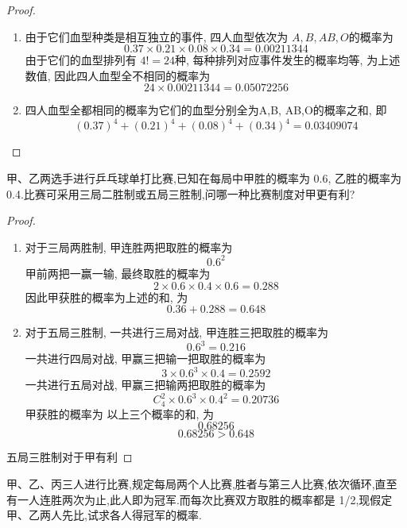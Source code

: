 \documentclass[../main.tex]{subfiles}
\begin{document}
\begin{proof}
    \begin{enumerate}
        \item 由于它们血型种类是相互独立的事件, 四人血型依次为 \(  A,B, AB, O  \)的概率为 \[
        0.37\times 0.21\times 0.08\times 0.34= 0.00211344
        \]  由于它们的血型排列有 \(  4!= 24  \)种,  每种排列对应事件发生的概率均等, 为上述数值, 因此四人血型全不相同的概率为 \[
        24\times 0.00211344= 0.05072256
        \]
        \item 四人血型全都相同的概率为它们的血型分别全为A,B, AB,O的概率之和, 即 \[
        \left( 0.37 \right)^{4}+ \left( 0.21 \right)^{4}+ \left( 0.08 \right)^{4}+ \left( 0.34 \right)^{4}=     0.03409074
        \]
    \end{enumerate}
    
\end{proof}
\begin{exercise}{}{}
甲、乙两选手进行乒乓球单打比赛,已知在每局中甲胜的概率为 0.6, 乙胜的概率为 0.4.比赛可采用三局二胜制或五局三胜制,问哪一种比赛制度对甲更有利?
\end{exercise}
\begin{proof}
   \begin{enumerate}
    \item  对于三局两胜制, 甲连胜两把取胜的概率为 \[
    0.6^{2}
    \]甲前两把一赢一输, 最终取胜的概率为 \[
    2\times  0.6\times 0.4\times 0.6=0.288
    \]因此甲获胜的概率为上述的和, 为 \[
    0.36+ 0.288= 0.648
    \]
    \item 对于五局三胜制, 一共进行三局对战, 甲连胜三把取胜的概率为 \[
    0.6^{3}= 0.216
    \]
    一共进行四局对战, 甲赢三把输一把取胜的概率为 \[
    3\times 0.6^{3}\times 0.4= 0.2592
    \]一共进行五局对战, 甲赢三把输两把取胜的概率为 \[
    C_{4}^{2}\times 0.6^{3}\times 0.4^{2}= 0.20736
    \]甲获胜的概率为 以上三个概率的和, 为 \[
    0.68256
    \] \[
    0.68256> 0.648
    \]
   \end{enumerate}
   五局三胜制对于甲有利
\end{proof}


\begin{exercise}{}{}
甲、乙、丙三人进行比赛,规定每局两个人比赛,胜者与第三人比赛,依次循环,直至有一人连胜两次为止,此人即为冠军.而每次比赛双方取胜的概率都是 1/2,现假定甲、乙两人先比,试求各人得冠军的概率.
\end{exercise}
\end{document}
